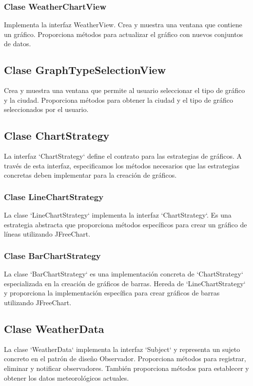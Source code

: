 \documentclass{article}
\begin{document}
\subsubsection{Clase WeatherChartView}
Implementa la interfaz WeatherView. Crea y muestra una ventana que contiene un gráfico. Proporciona métodos para actualizar el gráfico con nuevos conjuntos de datos.

\subsection{Clase GraphTypeSelectionView}
Crea y muestra una ventana que permite al usuario seleccionar el tipo de gráfico y la ciudad. Proporciona métodos para obtener la ciudad y el tipo de gráfico seleccionados por el usuario.

\subsection{Clase ChartStrategy}
La interfaz `ChartStrategy` define el contrato para las estrategias de gráficos. A través de esta interfaz, especificamos los métodos necesarios que las estrategias concretas deben implementar para la creación de gráficos.

\subsubsection{Clase LineChartStrategy}
La clase `LineChartStrategy` implementa la interfaz `ChartStrategy`. Es una estrategia abstracta que proporciona métodos específicos para crear un gráfico de líneas utilizando JFreeChart.

\subsubsection{Clase BarChartStrategy}
La clase `BarChartStrategy` es una implementación concreta de `ChartStrategy` especializada en la creación de gráficos de barras. Hereda de `LineChartStrategy` y proporciona la implementación específica para crear gráficos de barras utilizando JFreeChart.

\subsection{Clase WeatherData}
La clase `WeatherData` implementa la interfaz `Subject` y representa un sujeto concreto en el patrón de diseño Observador. Proporciona métodos para registrar, eliminar y notificar observadores. También proporciona métodos para establecer y obtener los datos meteorológicos actuales.
\end{document}
